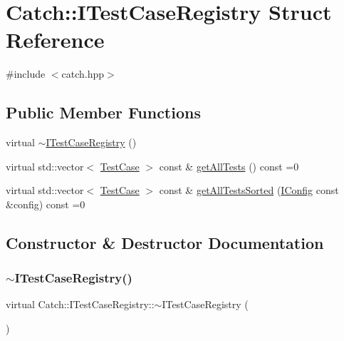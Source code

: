 \hypertarget{struct_catch_1_1_i_test_case_registry}{}\section{Catch\+:\+:I\+Test\+Case\+Registry Struct Reference}
\label{struct_catch_1_1_i_test_case_registry}


{\ttfamily \#include $<$catch.\+hpp$>$}

\subsection*{Public Member Functions}
\begin{DoxyCompactItemize}
\item 
virtual \mbox{\hyperlink{struct_catch_1_1_i_test_case_registry_ae14798f05ac8e2b18cff532849a4da81}{$\sim$\+I\+Test\+Case\+Registry}} ()
\item 
virtual std\+::vector$<$ \mbox{\hyperlink{class_catch_1_1_test_case}{Test\+Case}} $>$ const  \& \mbox{\hyperlink{struct_catch_1_1_i_test_case_registry_ad6e4d4a621655123f73ae98cfeda063d}{get\+All\+Tests}} () const =0
\item 
virtual std\+::vector$<$ \mbox{\hyperlink{class_catch_1_1_test_case}{Test\+Case}} $>$ const  \& \mbox{\hyperlink{struct_catch_1_1_i_test_case_registry_a33e46639d0319d35497c05bb5d02be5a}{get\+All\+Tests\+Sorted}} (\mbox{\hyperlink{struct_catch_1_1_i_config}{I\+Config}} const \&config) const =0
\end{DoxyCompactItemize}


\subsection{Constructor \& Destructor Documentation}
\mbox{\label{struct_catch_1_1_i_test_case_registry_ae14798f05ac8e2b18cff532849a4da81}} 
\subsubsection{\texorpdfstring{$\sim$\+I\+Test\+Case\+Registry()}{~ITestCaseRegistry()}}
{\footnotesize\ttfamily virtual Catch\+::\+I\+Test\+Case\+Registry\+::$\sim$\+I\+Test\+Case\+Registry (\begin{DoxyParamCaption}{ }\end{DoxyParamCaption})\hspace{0.3cm}{\ttfamily [virtual]}}



